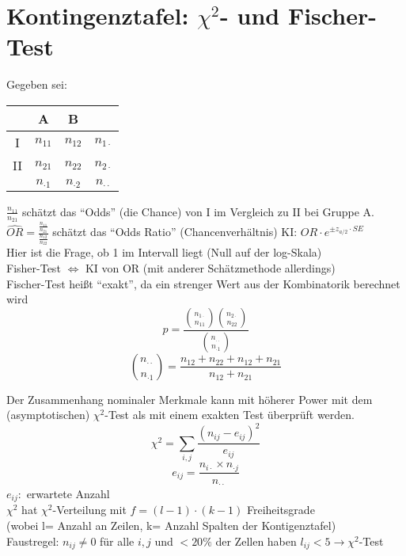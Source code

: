\section{Kontingenztafel: $\chi^2$- und Fischer-Test}
Gegeben sei:
\begin{tabular}{c|c|c|c}
	& A & B \\ \hline
	I & $n_{11}$ & $n_{12}$ & $n_{1\cdot}$ \\ \hline
	II & $n_{21}$ & $n_{22}$ & $n_{2\cdot}$ \\ \hline
	& $n_{\cdot1}$ & $n_{\cdot2}$ & $n_{\cdot\cdot}$
\end{tabular}
\newline
$\frac{n_{11}}{n_{21}}$ schätzt das ``Odds'' (die Chance) von I im Vergleich zu II bei Gruppe A. \\
$\widehat{OR}=\frac{\frac{n_{11}}{n_{21}}}{\frac{n_{12}}{n_{22}}}$ schätzt das ``Odds Ratio'' (Chancenverhältnis) KI: $OR \cdot e^{\pm z_{a/2} \cdot SE}$ \\
Hier ist die Frage, ob 1 im Intervall liegt (Null auf der log-Skala)\\
Fisher-Test $\Leftrightarrow$ KI von OR (mit anderer Schätzmethode allerdings)  \\
Fischer-Test heißt ``exakt'', da ein strenger Wert aus der Kombinatorik berechnet wird
\[ p = \frac{\binom{n_{1\cdot}}{n_{11}} \binom{n_{2\cdot}}{n_{22}}}{ \binom{n_{\cdot \cdot}}{n_{\cdot1}}} \]
\[ \binom{n_{\cdot\cdot}}{n_{\cdot1}} = \frac{n_{12} + n_{22} + n_{12} + n_{21} }{n_{12} + n_{21} } \]

Der Zusammenhang nominaler Merkmale kann mit höherer Power mit dem (asymptotischen) $\chi^2$-Test als mit einem exakten Test überprüft werden.
\[ \chi^2 = \sum\limits_{i,j} \frac{(n_{ij} - e_{ij})^2}{e_{ij}} \]
\[ e_{ij}= \frac{n_{i\cdot} \times n_{\cdot j}}{n_{\cdot \cdot}} \]
$e_{ij}:$ erwartete Anzahl \\
$\chi^2$ hat $\chi^2$-Verteilung mit $f=(l-1)\cdot(k-1)$ Freiheitsgrade  \\
(wobei l= Anzahl an Zeilen, k= Anzahl Spalten der Kontigenztafel) \\
Faustregel: $n_{ij} \neq 0$ für alle $i,j$ und $< 20 \%$ der Zellen haben $l_{ij} < 5 \rightarrow \chi^2$-Test \\

